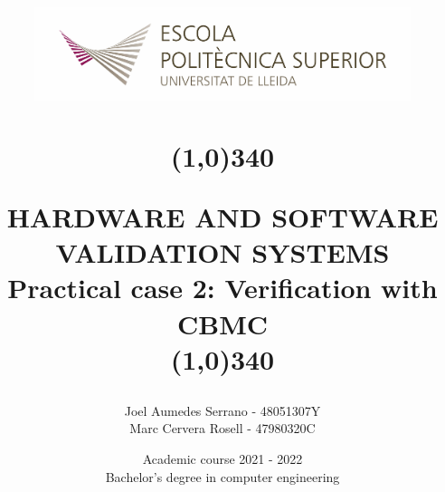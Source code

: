\title{
	\begin{center}
	\vspace{3cm}
	\includegraphics[width=11cm, height=3cm]{images/Logo-nou-eps.jpg}
	\end{center}
	\begin{center}
	\line(1,0){340}
	\end{center}		
	HARDWARE AND SOFTWARE VALIDATION SYSTEMS\\
	\vspace{2mm}
	\Large Practical case 2: Verification with CBMC\\
	\line(1,0){340}
	\vspace{2.5cm}
	}

\author{Joel Aumedes Serrano - 48051307Y \\   Marc Cervera Rosell - 47980320C \vspace{1cm}}


\date{Academic course 2021 - 2022\vspace{0.5cm} \\Bachelor's degree in computer engineering}